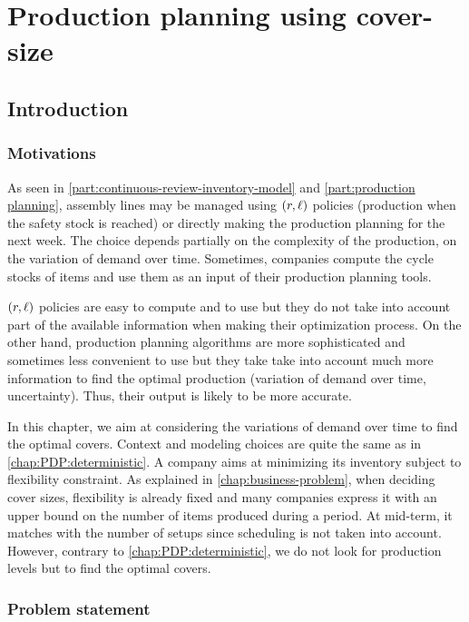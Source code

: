 \chapter{Production planning using cover-size}


\section{Introduction}


\subsection{Motivations}


As seen in \cref{part:continuous-review-inventory-model} and \cref{part:production planning}, assembly lines may be managed using $\bracket{r,\ell}$ policies (\ie production when the safety stock is reached) or directly making the production planning for the next week.
The choice depends partially on the complexity of the production, on the variation of demand over time.
Sometimes, companies compute the cycle stocks of items and use them as an input of their production planning tools.


$\bracket{r,\ell}$ policies are easy to compute and to use but they do not take into account part of the available information when making their optimization process.
On the other hand, production planning algorithms are more sophisticated and sometimes less convenient to use but they take take into account much more information to find the optimal production (variation of demand over time, uncertainty).
Thus, their output is likely to be more accurate.


In this chapter, we aim at considering the variations of demand over time to find the optimal covers.
Context and modeling choices are quite the same as in \cref{chap:PDP:deterministic}.
A company aims at minimizing its inventory subject to flexibility constraint.
As explained in \cref{chap:business-problem}, when deciding cover sizes, flexibility is already fixed and many companies express it with an upper bound on the number of items produced during a period.
At mid-term, it matches with the number of setups since scheduling is not taken into account.
However, contrary to \cref{chap:PDP:deterministic}, we do not look for production levels but to find the optimal covers.



\subsection{Problem statement}


